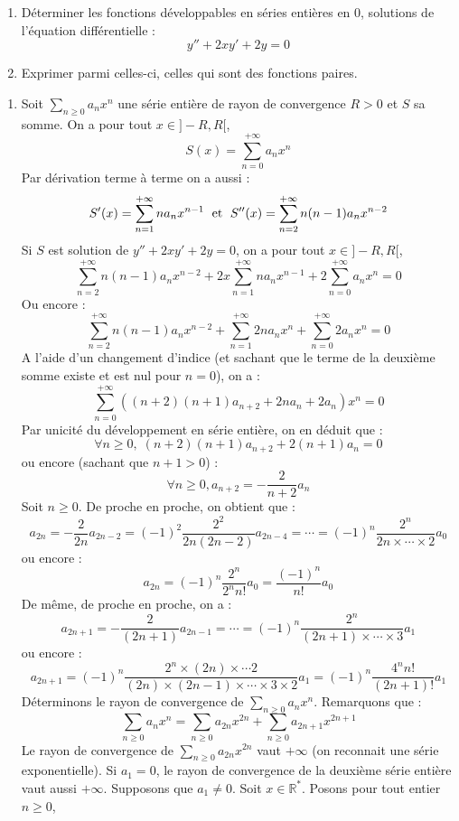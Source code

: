 \documentclass[a4paper,10pt]{report}
\newcommand{\Sum}[2]{\ensuremath{\textstyle{\sum\limits_{#1}^{#2}}}}
\begin{document}
\begin{Exa} \begin{enumerate}
  \item Déterminer les fonctions développables en séries entières en $0$, solutions de l'équation différentielle :
    \[
    y'' + 2xy' + 2y = 0
    \]
  \item Exprimer parmi celles-ci, celles qui sont des fonctions paires.
  \end{enumerate}
\end{Exa} 

\newpage

\corr 
\begin{enumerate}
\item Soit $\Sum{n \geq 0}{} a_n x^n$ une série entière de rayon de convergence $R>0$ et $S$ sa somme. On a pour tout $x \in ]-R,R[$,
$$ S(x) = \sum_{n=0}^{+ \infty} a_n x^n$$
Par dérivation terme à terme on a aussi :
$$ S'(x) = \sum_{n=1}^{+ \infty} n a_n x^{n-1} \; \hbox{ et } \; S''(x) = \sum_{n=2}^{+ \infty} n(n-1) a_n x^{n-2}$$
Si $S$ est solution de $y'' + 2xy' + 2y = 0$, on a pour tout $x \in ]-R,R[$,
$$ \sum_{n=2}^{+ \infty} n(n-1) a_n x^{n-2} + 2x \sum_{n=1}^{+ \infty} n a_n x^{n-1} + 2\sum_{n=0}^{+ \infty} a_n x^n = 0$$
Ou encore :
$$ \sum_{n=2}^{+ \infty} n(n-1) a_n x^{n-2} +  \sum_{n=1}^{+ \infty} 2n a_n x^{n} + \sum_{n=0}^{+ \infty} 2a_n x^n = 0$$
A l'aide d'un changement d'indice (et sachant que le terme de la deuxième somme existe et est nul pour $n=0$), on a :
$$ \sum_{n=0}^{+ \infty}  ((n+2)(n+1) a_{n+2} + 2n a_n + 2a_n)x^n = 0$$
Par unicité du développement en série entière, on en déduit que :
$$ \forall n \geq 0, \; (n+2)(n+1) a_{n+2} + 2(n+1) a_n =0$$
ou encore (sachant que $n+1>0$) :
$$ \forall n \geq 0, a_{n+2} = -\dfrac{2}{n+2} a_n $$
Soit $n \geq 0$. De proche en proche, on obtient que :
$$ a_{2n} = - \dfrac{2}{2n} a_{2n-2} = (-1)^2 \dfrac{2^2}{2n(2n-2)} a_{2n-4} = \cdots = (-1)^n \dfrac{2^n}{2n \times \cdots \times 2} a_0$$
ou encore :
$$ a_{2n} = (-1)^n \dfrac{2^n}{2^n n!} a_0 = \dfrac{(-1)^n}{n!} a_0 $$
De même, de proche en proche, on a :
$$ a_{2n+1} = - \dfrac{2}{(2n+1)} a_{2n-1} = \cdots = (-1)^n \dfrac{2^n}{(2n+1) \times \cdots \times 3} a_1$$
ou encore :
$$ a_{2n+1} = (-1)^n \dfrac{2^n \times (2n) \times \cdots 2}{(2n) \times(2n-1) \times \cdots \times 3 \times 2} a_1 = (-1)^n \dfrac{4^n n!}{(2n+1)!} a_1$$
Déterminons le rayon de convergence de $\Sum{n \geq 0}{} a_n x^n$. Remarquons que :
$$ \sum_{n \geq 0} a_n x^n = \sum_{n \geq 0} a_{2n} x^{2n} + \sum_{n \geq 0} a_{2n+1} x^{2n+1}$$
Le rayon de convergence de $\Sum{n \geq 0}{} a_{2n} x^{2n}$ vaut $+ \infty$ (on reconnait une série exponentielle). Si $a_1=0$, le rayon de convergence de la deuxième série entière vaut aussi $+ \infty$. Supposons que $a_1 \neq 0$. Soit $x \in \mathbb{R}^*$. Posons pour tout entier $n \geq 0$,

\end{enumerate}
\end{document}
